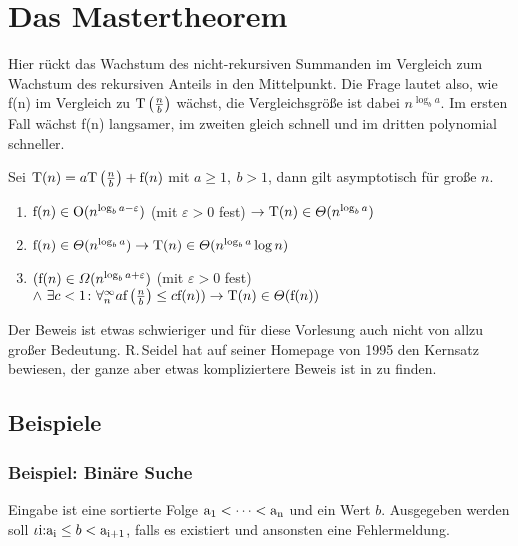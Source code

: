 \documentclass[ngerman,draft,parskip=half*,twoside]{scrreprt}
\theoremstyle{break}
\begin{document}
\section{Das Mastertheorem}
Hier rückt das Wachstum des nicht-rekursiven Summanden im Vergleich zum Wachstum des rekursiven Anteils in den Mittelpunkt. Die Frage
lautet also, wie f(n) im Vergleich zu \(\textup{T}\left(\frac{n}{b}\right)\) wächst, die Vergleichsgröße ist dabei \(n^{\log_ba}\).
Im ersten Fall wächst f(n) langsamer, im zweiten gleich schnell und im dritten polynomial schneller.

Sei \(\textup{T}(n)=a \textup{T}\left(\frac{n}{b}\right)+\textup{f}(n)\) mit \( a \geq 1,\ b > 1\), 
dann gilt asymptotisch für große $n$.

\begin{enumerate}
\item \(\textup{f}(n) \in \textup{O}(n^{\log_ba-\varepsilon} ) \) (mit \(\varepsilon > 0\) fest) \(\rightarrow \textup{T}(n) \in\Theta(n^{\log_ba})\)

\item \(\textup{f}(n) \in\Theta(n^{\log_ba}) \rightarrow \textup{T}(n) \in\Theta(n^{\log_ba} \log n)\)

\item \((\textup{f}(n) \in\Omega(n^{\log_ba+\varepsilon} ) \) (mit \( \varepsilon > 0 \) fest)
\(\wedge\ \exists c < 1 \colon  \forall^{\infty}_{n}
a \textup{f}\left(\frac{n}{b}\right)  \leq c \textup{f}(n)) \rightarrow \textup{T}(n) \in \Theta(\textup{f}(n))\)
\end{enumerate}

Der Beweis ist etwas schwieriger und für diese Vorlesung auch nicht
von allzu großer Bedeutung.
R.\,Seidel hat auf seiner Homepage
von 1995 den Kernsatz bewiesen, der ganze aber etwas kompliziertere Beweis ist in \cite{cormen} zu finden. 

\subsection{Beispiele}
\subsubsection{Beispiel: Binäre Suche} 

Eingabe ist eine sortierte Folge \(\textup{a}_1 < \dots < \textup{a}_{\textup{n}}\) und ein Wert $b$. Ausgegeben werden soll
\(\iota \textup{i:a}_{\textup{i}} \leq b < \textup{a}_{\textup{i+1}}\), falls es existiert und ansonsten eine Fehlermeldung.
\bigskip
\end{document}
